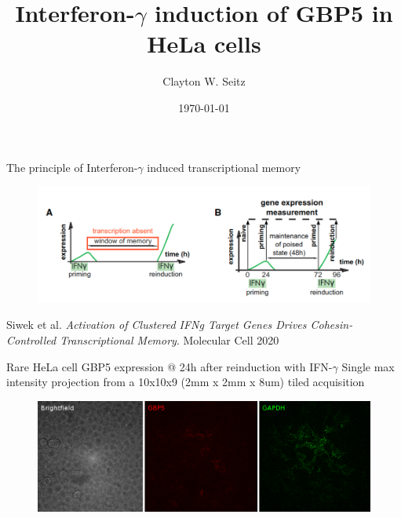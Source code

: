 \documentclass[aspectratio=1610]{beamer}					%
\title{Interferon-$\gamma$ induction of GBP5 in HeLa cells}	%
\author{Clayton W. Seitz}								%
\date{\today}									%
\begin{document}
\begin{frame}
  \titlepage
\end{frame}


%

\begin{frame}{The principle of Interferon-$\gamma$ induced transcriptional memory}
\begin{figure}
\includegraphics[width=14cm]{Memory.png}
\caption{}
\end{figure}

Siwek et al. \textit{Activation of Clustered IFNg Target Genes Drives Cohesin-Controlled Transcriptional Memory}. Molecular Cell 2020

\end{frame}


\begin{frame}{Rare HeLa cell GBP5 expression @ 24h after reinduction with IFN-$\gamma$}
Single max intensity projection from a 10x10x9 (2mm x 2mm x 8um) tiled acquisition

\begin{figure}
\includegraphics[width=14cm]{FullField.png}
\end{figure}

\end{frame}
\end{document}
